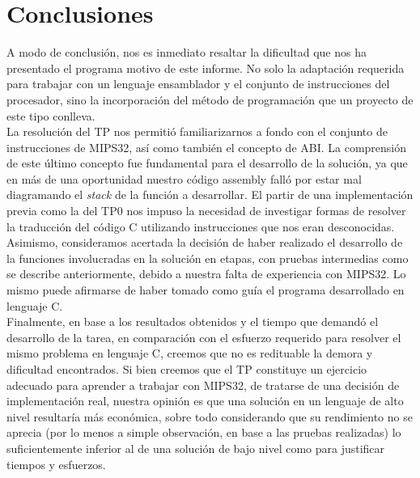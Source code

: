 \documentclass[a4paper,10pt]{article}
\begin{document}
\section{Conclusiones}
A modo de conclusi\'on, nos es inmediato resaltar la dificultad que nos ha presentado el programa motivo de este informe. No solo la adaptaci\'on requerida para trabajar con un lenguaje ensamblador y el conjunto de instrucciones del procesador, sino la incorporaci\'on del m\'etodo de programaci\'on que un proyecto de este tipo conlleva.\\

La resoluci\'on del TP nos permiti\'o familiarizarnos a fondo con el conjunto de instrucciones de MIPS32, as\'i como tambi\'en el concepto de ABI. La comprensi\'on de este \'ultimo concepto fue fundamental para el desarrollo de la soluci\'on, ya que en m\'as de una oportunidad nuestro c\'odigo assembly fall\'o por estar mal diagramando el \textit{stack} de la funci\'on a desarrollar. El partir de una implementaci\'on previa como la del TP0 nos impuso la necesidad de investigar formas de resolver la traducci\'on del c\'odigo C utilizando instrucciones que nos eran desconocidas.\\  

Asimismo, consideramos acertada la decisi\'on de haber realizado el desarrollo de la funciones involucradas en la soluci\'on en etapas, con pruebas intermedias como se describe anteriormente, debido a nuestra falta de experiencia con MIPS32. Lo mismo puede afirmarse de haber tomado como gu\'ia el programa desarrollado en lenguaje C.\\

Finalmente, en base a los resultados obtenidos y el tiempo que demand\'o el desarrollo de la tarea, en comparaci\'on con el esfuerzo requerido para resolver el mismo problema en lenguaje C, creemos que no es redituable la demora y dificultad encontrados. Si bien creemos que el TP constituye un ejercicio adecuado para aprender a trabajar con MIPS32, de tratarse de una decisi\'on de implementaci\'on real, nuestra opini\'on es que una soluci\'on en un lenguaje de alto nivel resultar\'ia m\'as econ\'omica, sobre todo considerando que su rendimiento no se aprecia (por lo menos a simple observaci\'on, en base a las pruebas realizadas) lo suficientemente inferior al de una soluci\'on de bajo nivel como para justificar tiempos y esfuerzos.
\pagebreak
\end{document}
